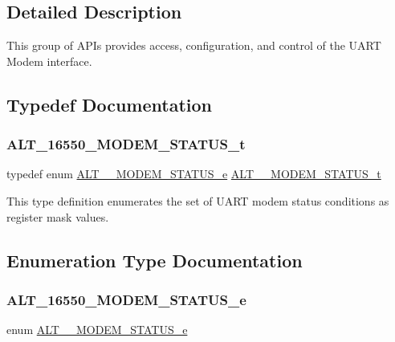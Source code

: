 \subsection{Detailed Description}
This group of A\+P\+Is provides access, configuration, and control of the U\+A\+RT Modem interface. 

\subsection{Typedef Documentation}
\mbox{\label{group__UART__MODEM_gae8a7a9a4cb9ef958c03411a3da02f786}} 
\subsubsection{\texorpdfstring{ALT\_16550\_MODEM\_STATUS\_t}{ALT\_16550\_MODEM\_STATUS\_t}}
{\footnotesize\ttfamily typedef enum \mbox{\hyperlink{group__UART__MODEM_ga39d4706d540334e2b2e18749187eb3bb}{A\+L\+T\+\_\+\_\+\+M\+O\+D\+E\+M\+\_\+\+S\+T\+A\+T\+U\+S\+\_\+e}}
 \mbox{\hyperlink{group__UART__MODEM_gae8a7a9a4cb9ef958c03411a3da02f786}{A\+L\+T\+\_\+\_\+\+M\+O\+D\+E\+M\+\_\+\+S\+T\+A\+T\+U\+S\+\_\+t}}}

This type definition enumerates the set of U\+A\+RT modem status conditions as register mask values. 

\subsection{Enumeration Type Documentation}
\mbox{\label{group__UART__MODEM_ga39d4706d540334e2b2e18749187eb3bb}} 
\subsubsection{\texorpdfstring{ALT\_16550\_MODEM\_STATUS\_e}{ALT\_16550\_MODEM\_STATUS\_e}}
{\footnotesize\ttfamily enum \mbox{\hyperlink{group__UART__MODEM_ga39d4706d540334e2b2e18749187eb3bb}{A\+L\+T\+\_\+\_\+\+M\+O\+D\+E\+M\+\_\+\+S\+T\+A\+T\+U\+S\+\_\+e}}}

